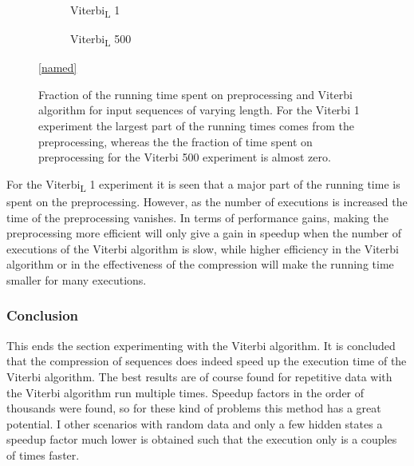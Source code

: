 \begin{figure}
  \centering
  \begin{subfigure}{0.5\textwidth}
    \centering 
    \caption{Viterbi\textsubscript{L} 1}
  \end{subfigure}%
  \begin{subfigure}{0.5\textwidth}
    \centering 
    \caption{Viterbi\textsubscript{L} 500}
  \end{subfigure}

  \ref{named}
  \caption{Fraction of the running time spent on preprocessing and Viterbi
    algorithm for input sequences of varying length. For the Viterbi 1
    experiment the largest part of the running times comes from the
    preprocessing, whereas the the fraction of time spent on preprocessing for
    the Viterbi 500 experiment is almost zero.}
  \label{fig:pre_vs_running}
\end{figure}

For the Viterbi\textsubscript{L} 1 experiment it is seen that a major part of the running time
is spent on the preprocessing. However, as the number of executions is
increased the time of the preprocessing vanishes. In terms of performance
gains, making the preprocessing more efficient will only give a gain in speedup
when the number of executions of the Viterbi algorithm is slow, while higher
efficiency in the Viterbi algorithm or in the effectiveness of the compression
will make the running time smaller for many executions.

\subsubsection{Conclusion}

This ends the section experimenting with the Viterbi algorithm. It is concluded
that the compression of sequences does indeed speed up the execution time of
the Viterbi algorithm. The best results are of course found for repetitive data
with the Viterbi algorithm run multiple times. Speedup factors in the order of
thousands were found, so for these kind of problems this method has a great
potential. I other scenarios with random data and only a few hidden states a
speedup factor much lower is obtained such that the execution only is a couples
of times faster.


